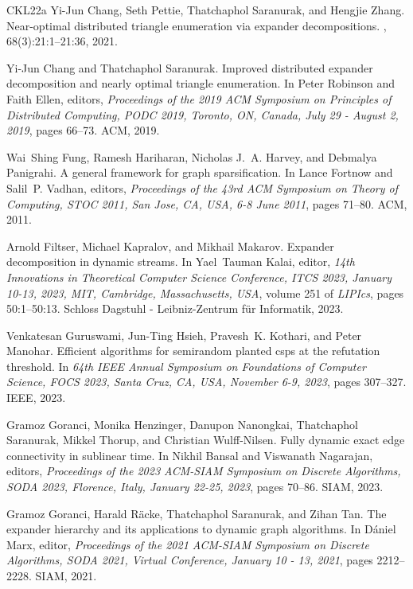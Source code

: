 \documentclass[epsfig,letter,11pt]{article}
\numberwithin{equation}{section}
\begin{document}
\begin{thebibliography}{CKL{\etalchar{+}}22a}
Yi{-}Jun Chang, Seth Pettie, Thatchaphol Saranurak, and Hengjie Zhang.
\newblock Near-optimal distributed triangle enumeration via expander
  decompositions.
, 68(3):21:1--21:36, 2021.

Yi{-}Jun Chang and Thatchaphol Saranurak.
\newblock Improved distributed expander decomposition and nearly optimal
  triangle enumeration.
\newblock In Peter Robinson and Faith Ellen, editors, {\em Proceedings of the
  2019 {ACM} Symposium on Principles of Distributed Computing, {PODC} 2019,
  Toronto, ON, Canada, July 29 - August 2, 2019}, pages 66--73. {ACM}, 2019.

Wai~Shing Fung, Ramesh Hariharan, Nicholas J.~A. Harvey, and Debmalya
  Panigrahi.
\newblock A general framework for graph sparsification.
\newblock In Lance Fortnow and Salil~P. Vadhan, editors, {\em Proceedings of
  the 43rd {ACM} Symposium on Theory of Computing, {STOC} 2011, San Jose, CA,
  USA, 6-8 June 2011}, pages 71--80. {ACM}, 2011.

Arnold Filtser, Michael Kapralov, and Mikhail Makarov.
\newblock Expander decomposition in dynamic streams.
\newblock In Yael~Tauman Kalai, editor, {\em 14th Innovations in Theoretical
  Computer Science Conference, {ITCS} 2023, January 10-13, 2023, MIT,
  Cambridge, Massachusetts, {USA}}, volume 251 of {\em LIPIcs}, pages
  50:1--50:13. Schloss Dagstuhl - Leibniz-Zentrum f{\"{u}}r Informatik, 2023.

Venkatesan Guruswami, Jun{-}Ting Hsieh, Pravesh~K. Kothari, and Peter Manohar.
\newblock Efficient algorithms for semirandom planted csps at the refutation
  threshold.
\newblock In {\em 64th {IEEE} Annual Symposium on Foundations of Computer
  Science, {FOCS} 2023, Santa Cruz, CA, USA, November 6-9, 2023}, pages
  307--327. {IEEE}, 2023.

Gramoz Goranci, Monika Henzinger, Danupon Nanongkai, Thatchaphol Saranurak,
  Mikkel Thorup, and Christian Wulff{-}Nilsen.
\newblock Fully dynamic exact edge connectivity in sublinear time.
\newblock In Nikhil Bansal and Viswanath Nagarajan, editors, {\em Proceedings
  of the 2023 {ACM-SIAM} Symposium on Discrete Algorithms, {SODA} 2023,
  Florence, Italy, January 22-25, 2023}, pages 70--86. {SIAM}, 2023.

Gramoz Goranci, Harald R{\"{a}}cke, Thatchaphol Saranurak, and Zihan Tan.
\newblock The expander hierarchy and its applications to dynamic graph
  algorithms.
\newblock In D{\'{a}}niel Marx, editor, {\em Proceedings of the 2021 {ACM-SIAM}
  Symposium on Discrete Algorithms, {SODA} 2021, Virtual Conference, January 10
  - 13, 2021}, pages 2212--2228. {SIAM}, 2021.


\end{thebibliography}
\end{document}
